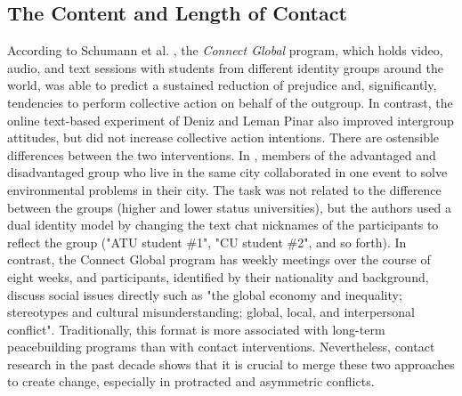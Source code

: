 \documentclass[dissertation,math,vertlayout,pdfa,colorlinks,nologo]{aaltoseries}
\begin{document}
\subsection{The Content and Length of Contact}
According to Schumann et al. \cite{schumannWhatCanBe2022}, the \textit{Connect Global} program, which holds video, audio, and text sessions with students from different identity groups around the world, was able to predict a sustained reduction of prejudice and, significantly, tendencies to perform collective action on behalf of the outgroup. In contrast, the online text-based experiment of Deniz and Leman Pinar \cite{enicOnlineContactsSupported2024} also improved intergroup attitudes, but did not increase collective action intentions. There are ostensible differences between the two interventions. In \cite{enicOnlineContactsSupported2024}, members of the advantaged and disadvantaged group who live in the same city collaborated in one event to solve environmental problems in their city. The task was not related to the difference between the groups (higher and lower status universities), but the authors used a dual identity model by changing the text chat nicknames of the participants to reflect the group ("ATU student \#1", "CU student \#2", and so forth). In contrast, the Connect Global program has weekly meetings over the course of eight weeks, and participants, identified by their nationality and background, discuss social issues directly such as "the global economy and inequality; stereotypes and cultural misunderstanding; global, local, and interpersonal conflict". Traditionally, this format is more associated with long-term peacebuilding programs than with contact interventions. Nevertheless, contact research in the past decade shows that it is crucial to merge these two approaches to create change, especially in protracted and asymmetric conflicts.
\end{document}
